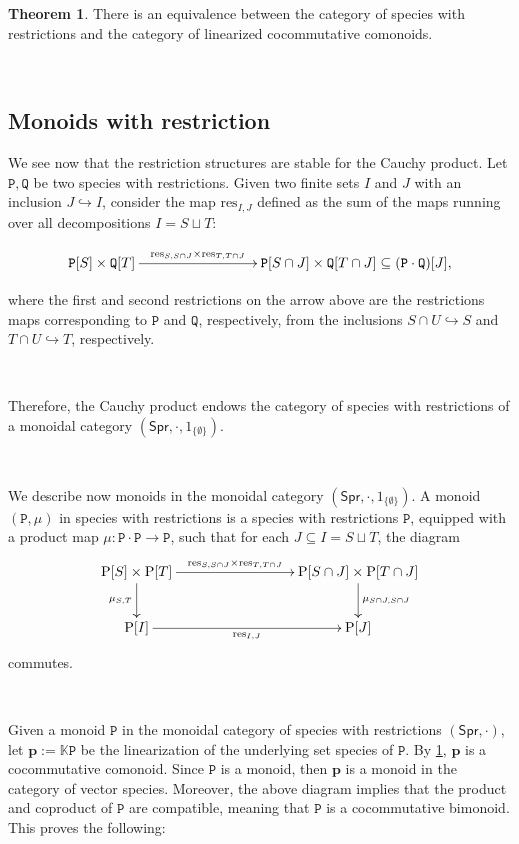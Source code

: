 \documentclass[12pt, reqno]{amsart}
\theoremstyle{definition}
\newtheorem{thm}{Theorem}[section]
\newcommand{\Spr}{\mathsf{Spr}} %
\newcommand{\rP}{\mathrm{P}}
\newcommand{\prP}{\mathtt{P}}
\newcommand{\prQ}{\mathtt{Q}}
\newcommand{\tp}{\mathbf{p}}
\begin{document}
\begin{thm}\label{thm:swr_lcc}
There is an equivalence between the category of species with restrictions and the category of linearized cocommutative comonoids.
\end{thm}

\

\subsection{Monoids with restriction}
We see now that the restriction structures are stable for the Cauchy product.
Let $\prP, \prQ$ be two species with restrictions.
Given two finite sets $I$ and $J$ with an inclusion $J \hookrightarrow I$, consider the map $\text{res}_{I,J}$ defined as the sum of the maps running over all decompositions $I=S\sqcup T$:

\[\xymatrix{
\prP[S]\times \prQ[T] \ar[rrr]^-{\text{res}_{S, S\cap J} \times \text{res}_{T, T\cap J}}&&& \prP[S\cap J]\times \prQ[T\cap J] \subseteq (\prP \cdot \prQ)[J],
}\]

where the first and second restrictions on the arrow above are the restrictions maps corresponding to $\prP$ and $\prQ$, respectively, from the inclusions $S \cap U \hookrightarrow S$ and $T \cap U \hookrightarrow T$, respectively. 

\

Therefore, the Cauchy product endows the category of species with restrictions of a monoidal category $(\Spr, \cdot, \mathrm{1}_{\{\emptyset\}})$.

\

We describe now monoids in the monoidal category $(\Spr, \cdot, \mathrm{1}_{\{\emptyset \} })$. A monoid $(\prP, \mu)$ in species with restrictions is a species with restrictions $\prP$, equipped with a product map $\mu: \prP \cdot \prP \to \prP$, such that for each $J \subseteq I=S\sqcup T$, the diagram
\[\xymatrix{
\rP[S]\times \rP[T]\ar[d]_-{\mu_{S,T}} \ar[rrr]^-{\text{res}_{S, S\cap J} \times \text{res}_{T, T\cap J}}&&&\rP[S \cap J]\times \rP[T\cap J]\ar[d]^-{\mu_{S \cap J, S\cap J}}\\
\rP[I]\ar[rrr]_-{\text{res}_{I,J}}&&& \rP[J]
}\]
commutes.

\

Given a monoid $\prP$ in the monoidal category of species with restrictions $(\Spr, \cdot)$, let $\tp:=\mathbb{K}\prP$ be the linearization of the underlying set species of $\prP$. 
By \cref{thm:swr_lcc}, $\tp$ is a cocommutative comonoid. Since $\prP$ is a monoid, then $\tp$ is a monoid in the category of vector species. Moreover, the above diagram implies that the product and coproduct of $\prP$ are compatible, meaning that $\prP$ is a cocommutative bimonoid. 
This proves the following:
\end{document}
